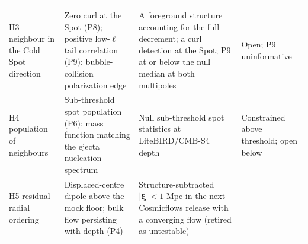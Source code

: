 \documentclass[
]{article}
\begin{document}
\begin{longtable}[]{@{}llll@{}}
\begin{minipage}[t]{0.22\columnwidth}
\end{minipage}\tabularnewline
\begin{minipage}[t]{0.22\columnwidth}\raggedright
H3 neighbour in the Cold Spot direction\strut
\end{minipage} & \begin{minipage}[t]{0.22\columnwidth}\raggedright
Zero curl at the Spot (P8); positive low-\(\ell\) tail correlation (P9);
bubble-collision polarization edge\strut
\end{minipage} & \begin{minipage}[t]{0.22\columnwidth}\raggedright
A foreground structure accounting for the full decrement; a curl
detection at the Spot; P9 at or below the null median at both
multipoles\strut
\end{minipage} & \begin{minipage}[t]{0.22\columnwidth}\raggedright
Open; P9 uninformative\strut
\end{minipage}\tabularnewline
\begin{minipage}[t]{0.22\columnwidth}\raggedright
H4 population of neighbours\strut
\end{minipage} & \begin{minipage}[t]{0.22\columnwidth}\raggedright
Sub-threshold spot population (P6); mass function matching the ejecta
nucleation spectrum\strut
\end{minipage} & \begin{minipage}[t]{0.22\columnwidth}\raggedright
Null sub-threshold spot statistics at LiteBIRD/CMB-S4 depth\strut
\end{minipage} & \begin{minipage}[t]{0.22\columnwidth}\raggedright
Constrained above threshold; open below\strut
\end{minipage}\tabularnewline
\begin{minipage}[t]{0.22\columnwidth}\raggedright
H5 residual radial ordering\strut
\end{minipage} & \begin{minipage}[t]{0.22\columnwidth}\raggedright
Displaced-centre dipole above the mock floor; bulk flow persisting with
depth (P4)\strut
\end{minipage} & \begin{minipage}[t]{0.22\columnwidth}\raggedright
Structure-subtracted \(|\boldsymbol{\xi}| < 1\) Mpc in the next
Cosmicflows release with a converging flow (retired as untestable)\strut
\end{minipage} & \begin{minipage}[t]{0.22\columnwidth}\raggedright

\end{minipage}
\end{longtable}
\end{document}
